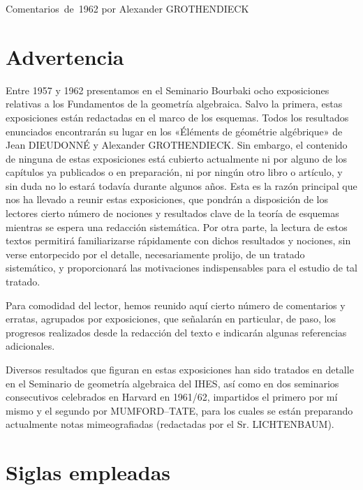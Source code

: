\unit{Comentarios de 1962}
%
  {por Alexander GROTHENDIECK}

\section*{Advertencia}

Entre 1957 y 1962 presentamos en el Seminario Bourbaki ocho exposiciones
relativas a los Fundamentos de la geometría algebraica. Salvo la primera,
estas exposiciones están redactadas en el marco de los esquemas. Todos los
resultados enunciados encontrarán su lugar en los «Éléments de géométrie
algébrique» de Jean DIEUDONNÉ y Alexander GROTHENDIECK. Sin embargo, el
contenido de ninguna de estas exposiciones está cubierto actualmente ni por
alguno de los capítulos ya publicados o en preparación, ni por ningún otro
libro o artículo, y sin duda no lo estará todavía durante algunos años. Esta
es la razón principal que nos ha llevado a reunir estas exposiciones, que
pondrán a disposición de los lectores cierto número de nociones y resultados
clave de la teoría de esquemas mientras se espera una redacción sistemática.
Por otra parte, la lectura de estos textos permitirá familiarizarse
rápidamente con dichos resultados y nociones, sin verse entorpecido por el
detalle, necesariamente prolijo, de un tratado sistemático, y proporcionará
las motivaciones indispensables para el estudio de tal tratado.

Para comodidad del lector, hemos reunido aquí cierto número de comentarios y
erratas, agrupados por exposiciones, que señalarán en particular, de paso, los
progresos realizados desde la redacción del texto e indicarán algunas
referencias adicionales.

Diversos resultados que figuran en estas exposiciones han sido tratados en
detalle en el Seminario de geometría algebraica del IHES, así como en dos
seminarios consecutivos celebrados en Harvard en 1961/62, impartidos el
primero por mí mismo y el segundo por MUMFORD--TATE, para los cuales se están
preparando actualmente notas mimeografiadas (redactadas por el Sr.
LICHTENBAUM).

\section*{Siglas empleadas}

